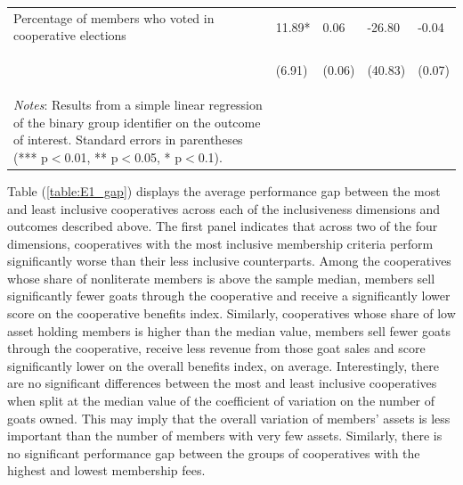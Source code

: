 \documentclass[11pt]{article}
\begin{document}
\begin{table}[H]
{\begin{tabularx}{1.5\linewidth}{lllll}
\noalign{\smallskip}Percentage of members who voted in cooperative elections & 11.89* & 0.06 & -26.80 & -0.04\\
 & \begin{footnotesize}(6.91)\end{footnotesize} & \begin{footnotesize}(0.06)\end{footnotesize} & \begin{footnotesize}(40.83)\end{footnotesize} & \begin{footnotesize}(0.07)\end{footnotesize}\\
\noalign{\smallskip}\hline
\multicolumn{5}{@{}p{1.5\linewidth}}
{\textit{Notes}: Results from a simple linear regression of the binary group identifier on the outcome of interest. Standard errors in parentheses (*** p$<$0.01, ** p$<$0.05, * p$<$0.1). }
  \end{tabularx}}
\end{table}
\doublespacing

Table (\ref{table:E1_gap}) displays the average performance gap between the most and least inclusive cooperatives across each of the inclusiveness dimensions and outcomes described above. The first panel indicates that across two of the four dimensions, cooperatives with the most inclusive membership criteria perform significantly worse than their less inclusive counterparts. Among the cooperatives whose share of nonliterate members is above the sample median, members sell significantly fewer goats through the cooperative and receive a significantly lower score on the cooperative benefits index. Similarly, cooperatives whose share of low asset holding members is higher than the median value, members sell fewer goats through the cooperative, receive less revenue from those goat sales and score significantly lower on the overall benefits index, on average. Interestingly, there are no significant differences between the most and least inclusive cooperatives when split at the median value of the coefficient of variation on the number of goats owned. This may imply that the overall variation of members' assets is less important than the number of members with very few assets. Similarly, there is no significant performance gap between the groups of cooperatives with the highest and lowest membership fees.
\end{document}
